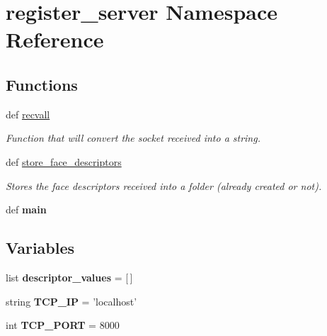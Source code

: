 \hypertarget{namespaceregister__server}{\section{register\-\_\-server Namespace Reference}
\label{namespaceregister__server}
}
\subsection*{Functions}
\begin{DoxyCompactItemize}
\item 
def \hyperlink{namespaceregister__server_a654f1f34668fd5e3226b59dd959859dd}{recvall}
\begin{DoxyCompactList}\small\item\em Function that will convert the socket received into a string. \end{DoxyCompactList}\item 
def \hyperlink{namespaceregister__server_a6934e435166c405b7697fdcd59acca49}{store\-\_\-face\-\_\-descriptors}
\begin{DoxyCompactList}\small\item\em Stores the face descriptors received into a folder (already created or not). \end{DoxyCompactList}\item 
\hypertarget{namespaceregister__server_af16f41fbfedd64be287beb0be24f3659}{def {\bfseries main}}\label{namespaceregister__server_af16f41fbfedd64be287beb0be24f3659}

\end{DoxyCompactItemize}
\subsection*{Variables}
\begin{DoxyCompactItemize}
\item 
\hypertarget{namespaceregister__server_addbb74304712e7f2b33f06c919beb501}{list {\bfseries descriptor\-\_\-values} = \mbox{[}$\,$\mbox{]}}\label{namespaceregister__server_addbb74304712e7f2b33f06c919beb501}

\item 
\hypertarget{namespaceregister__server_afb99a27b92f7b32543a70d6b8b189c70}{string {\bfseries T\-C\-P\-\_\-\-I\-P} = 'localhost'}\label{namespaceregister__server_afb99a27b92f7b32543a70d6b8b189c70}

\item 
\hypertarget{namespaceregister__server_aa32c493cf1ca9f8772cd6a02ceba5448}{int {\bfseries T\-C\-P\-\_\-\-P\-O\-R\-T} = 8000}\label{namespaceregister__server_aa32c493cf1ca9f8772cd6a02ceba5448}

\end{DoxyCompactItemize}


